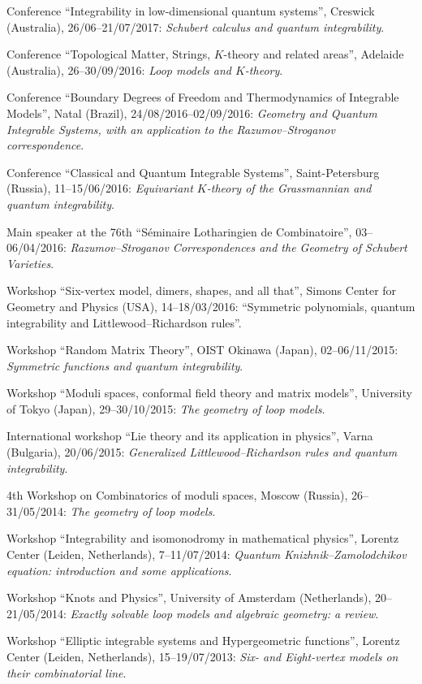 \s Conference ``Integrability in low-dimensional quantum systems'', Creswick (Australia), 26/06--21/07/2017: {\sl Schubert calculus and quantum integrability}.

\s Conference ``Topological Matter, Strings, $K$-theory and related areas'', Adelaide (Australia), 26--30/09/2016: {\sl Loop models and $K$-theory}.

\s Conference ``Boundary Degrees of Freedom and Thermodynamics of Integrable Models'', Natal (Brazil), 24/08/2016--02/09/2016: {\sl Geometry and Quantum Integrable Systems, with an application to the Razumov--Stroganov correspondence}.

\s Conference ``Classical and Quantum Integrable Systems'', Saint-Petersburg (Russia), 11--15/06/2016: {\sl Equivariant $K$-theory of the Grassmannian and quantum integrability}.

\s Main speaker at the 76th ``S\'eminaire Lotharingien de Combinatoire'',
03--06/04/2016: {\sl Razumov--Stroganov Correspondences and the Geometry of Schubert Varieties}.

\s Workshop ``Six-vertex model, dimers, shapes, and all that'', Simons Center for Geometry and Physics (USA), 14--18/03/2016:
``Symmetric polynomials, quantum integrability and Littlewood--Richardson rules''.

\s Workshop ``Random Matrix Theory'', OIST Okinawa (Japan), 02--06/11/2015:
{\sl Symmetric functions and quantum integrability}.

\s Workshop ``Moduli spaces, conformal field theory and matrix models'', University of Tokyo (Japan), 29--30/10/2015: {\sl The geometry of loop models}.


\s International workshop ``Lie theory and its application in physics'', Varna (Bulgaria), 20/06/2015: {\sl Generalized Littlewood--Richardson rules and quantum
integrability}.

\s 4th Workshop on Combinatorics of moduli spaces, Moscow (Russia),
26--31/05/2014: {\sl The geometry of loop models}.

\s Workshop ``Integrability and isomonodromy in mathematical physics'', Lorentz Center (Leiden, Netherlands), 7--11/07/2014: {\sl Quantum Knizhnik--Zamolodchikov equation: introduction and some applications}.

\s Workshop ``Knots and Physics'', University of Amsterdam (Netherlands), 20--21/05/2014: {\sl Exactly solvable loop models and algebraic geometry: a review}.

\s Workshop ``Elliptic integrable systems and Hypergeometric functions'', Lorentz Center (Leiden, Netherlands), 15--19/07/2013: {\sl Six- and Eight-vertex models on their combinatorial line}.

